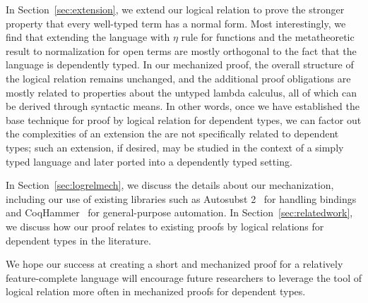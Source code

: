 \documentclass[acmsmall]{acmart}
\begin{document}
In Section~\ref{sec:extension}, we extend our logical
relation to prove the stronger property that every well-typed term
has a normal form. Most interestingly, we find that extending the
language with
$\eta$ rule for functions and the metatheoretic result to normalization for open terms are
mostly orthogonal to the fact that the language is dependently
typed. In our mechanized proof, the overall
structure of the logical relation remains unchanged, and the additional
proof obligations are mostly related to properties about the untyped
lambda calculus, all of which can be derived through syntactic
means.
In other words, once we have established the base technique for
proof by logical relation for dependent types, we can factor out the
complexities of an extension the are not specifically related to dependent
types; such an extension, if desired, may be studied in the context of
a simply typed language and later ported into a dependently typed setting.

In Section~\ref{sec:logrelmech}, we discuss the details about our
mechanization, including our use of existing libraries such as
Autosubst 2~\citep{autosubst2} for handling bindings and CoqHammer~\citep{czajka2018hammer} for general-purpose
automation.
In Section~\ref{sec:relatedwork}, we discuss how our proof
relates to existing proofs by logical relations for dependent types in
the literature.

We hope our success at creating a short and mechanized proof for a
relatively feature-complete language will encourage future researchers
to leverage the tool of logical relation more often in mechanized
proofs for dependent types.







\end{document}
